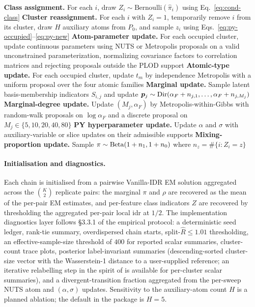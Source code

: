 \begin{algorithm}[H]
\DontPrintSemicolon
\caption{One sweep of Pitman--Yor P\'olya-urn MCMC for PY-IDR.}
\label{alg:mcmc}
\textbf{Class assignment.} For each $i$, draw $Z_i\sim\mathrm{Bernoulli}(\widehat\pi_i)$ using Eq.~\eqref{eq:cond-class}\;
\textbf{Cluster reassignment.} For each $i$ with $Z_i=1$, temporarily remove $i$ from its cluster, draw $H$ auxiliary atoms from $P_0$, and sample $z_i$ using Eqs.~\eqref{eq:py-occupied}--\eqref{eq:py-new}\;
\textbf{Atom-parameter update.} For each occupied cluster, update continuous parameters using NUTS or Metropolis proposals on a valid unconstrained parameterization, normalizing covariance factors to correlation matrices and rejecting proposals outside the PLOD support\;
\textbf{Atomic-type update.} For each occupied cluster, update $t_m$ by independence Metropolis with a uniform proposal over the four atomic families\;
\textbf{Marginal update.} Sample latent basis-membership indicators $S_{i,j}$ and update $\bm p_j\sim\mathrm{Dir}(\alpha_F+n_{j,1},\ldots,\alpha_F+n_{j,M_j})$\;
\textbf{Marginal-degree update.} Update $(M_j,\alpha_F)$ by Metropolis-within-Gibbs with random-walk proposals on $\log\alpha_F$ and a discrete proposal on $M_j\in\{5,10,20,40,80\}$\;
\textbf{PY hyperparameter update.} Update $\alpha$ and $\sigma$ with auxiliary-variable or slice updates on their admissible supports\;
\textbf{Mixing-proportion update.} Sample $\pi\sim\mathrm{Beta}(1+n_1,1+n_0)$ where $n_z=\#\{i:Z_i=z\}$\;
\;
\end{algorithm}

\paragraph{Initialisation and diagnostics.}
Each chain is initialised from a pairwise Vanilla-IDR EM solution aggregated
across the $\binom{K}{2}$ replicate pairs: the marginal $\pi$ and $\rho$ are
recovered as the mean of the per-pair EM estimates, and per-feature class
indicators $Z$ are recovered by thresholding the aggregated per-pair local
idr at $1/2$. The implementation diagnostics layer follows §3.3.1 of the
empirical protocol: a deterministic seed ledger, rank-tie summary,
overdispersed chain starts, split-$\widehat R\leq 1.01$ thresholding, an
effective-sample-size threshold of $400$ for reported scalar summaries,
cluster-count trace plots, posterior label-invariant summaries
(descending-sorted cluster-size vector with the Wasserstein-1 distance
to a user-supplied reference; an iterative relabelling step in the
spirit of \citet{Stephens2000Relabel} is available for per-cluster scalar
summaries), and a divergent-transition fraction aggregated from the
per-sweep NUTS atom and $(\alpha,\sigma)$ updates. Sensitivity to the auxiliary-atom count $H$ is a
planned ablation; the default in the package is $H{=}5$.

